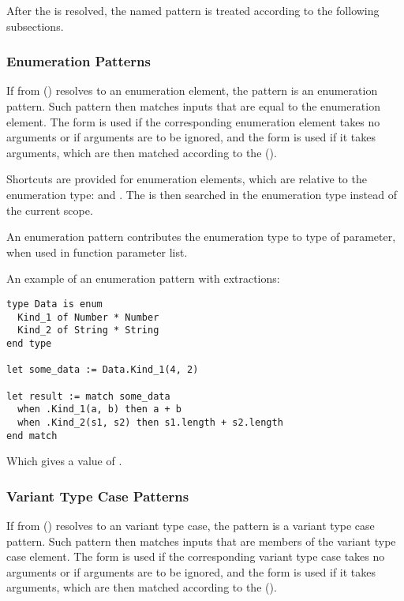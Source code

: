 After the  is resolved, the named pattern is treated according to the following subsections. 





\subsubsection{Enumeration Patterns}
\label{sec:enumeration-patterns}

If  from () resolves to an enumeration element, the pattern is an enumeration pattern. Such pattern then matches inputs that are equal to the enumeration element. The form  is used if the corresponding enumeration element takes no arguments or if arguments are to be ignored, and the form  is used if it takes arguments, which are then matched according to the  (). 

Shortcuts are provided for enumeration elements, which are relative to the enumeration type:  and . The  is then searched in the enumeration type instead of the current scope. 

An enumeration pattern contributes the enumeration type to type of parameter, when used in function parameter list. 

\example An example of an enumeration pattern with extractions:
\begin{lstlisting}
type Data is enum
  Kind_1 of Number * Number
  Kind_2 of String * String
end type

let some_data := Data.Kind_1(4, 2)

let result := match some_data
  when .Kind_1(a, b) then a + b
  when .Kind_2(s1, s2) then s1.length + s2.length
end match
\end{lstlisting}
Which gives  a value of . 





\subsubsection{Variant Type Case Patterns}
\label{sec:variant-patterns}

If  from () resolves to an variant type case, the pattern is a variant type case pattern. Such pattern then matches inputs that are members of the variant type case element. The form  is used if the corresponding variant type case takes no arguments or if arguments are to be ignored, and the form  is used if it takes arguments, which are then matched according to the  (). 

